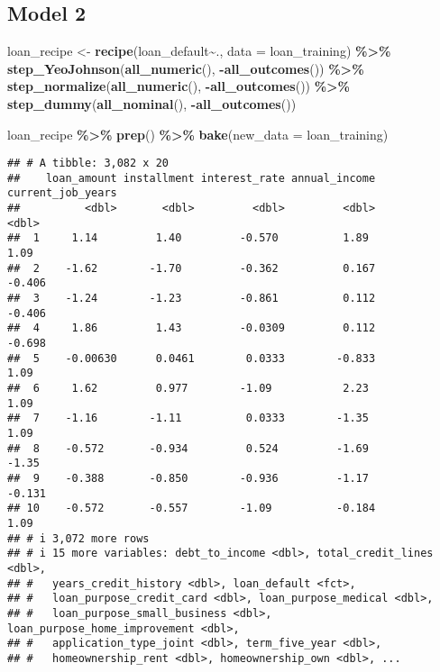 \documentclass[
]{article}
\newenvironment{Shaded}{\begin{snugshade}}{\end{snugshade}}
\newcommand{\AttributeTok}[1]{\textcolor[rgb]{0.13,0.29,0.53}{#1}}
\newcommand{\FunctionTok}[1]{\textcolor[rgb]{0.13,0.29,0.53}{\textbf{#1}}}
\newcommand{\NormalTok}[1]{#1}
\newcommand{\OtherTok}[1]{\textcolor[rgb]{0.56,0.35,0.01}{#1}}
\newcommand{\SpecialCharTok}[1]{\textcolor[rgb]{0.81,0.36,0.00}{\textbf{#1}}}
\begin{document}
\subsection{Model 2}\label{model-2}

\begin{Shaded}
\begin{Highlighting}[]
\NormalTok{loan\_recipe }\OtherTok{\textless{}{-}} \FunctionTok{recipe}\NormalTok{(loan\_default}\SpecialCharTok{\textasciitilde{}}\NormalTok{., }\AttributeTok{data =}\NormalTok{ loan\_training) }\SpecialCharTok{\%\textgreater{}\%} 
                  \FunctionTok{step\_YeoJohnson}\NormalTok{(}\FunctionTok{all\_numeric}\NormalTok{(), }\SpecialCharTok{{-}}\FunctionTok{all\_outcomes}\NormalTok{()) }\SpecialCharTok{\%\textgreater{}\%} 
                   \FunctionTok{step\_normalize}\NormalTok{(}\FunctionTok{all\_numeric}\NormalTok{(), }\SpecialCharTok{{-}}\FunctionTok{all\_outcomes}\NormalTok{()) }\SpecialCharTok{\%\textgreater{}\%} 
                   \FunctionTok{step\_dummy}\NormalTok{(}\FunctionTok{all\_nominal}\NormalTok{(), }\SpecialCharTok{{-}}\FunctionTok{all\_outcomes}\NormalTok{())}

\NormalTok{loan\_recipe }\SpecialCharTok{\%\textgreater{}\%} 
 \FunctionTok{prep}\NormalTok{() }\SpecialCharTok{\%\textgreater{}\%} 
  \FunctionTok{bake}\NormalTok{(}\AttributeTok{new\_data =}\NormalTok{ loan\_training)}
\end{Highlighting}
\end{Shaded}

\begin{verbatim}
## # A tibble: 3,082 x 20
##    loan_amount installment interest_rate annual_income current_job_years
##          <dbl>       <dbl>         <dbl>         <dbl>             <dbl>
##  1     1.14         1.40         -0.570          1.89              1.09 
##  2    -1.62        -1.70         -0.362          0.167            -0.406
##  3    -1.24        -1.23         -0.861          0.112            -0.406
##  4     1.86         1.43         -0.0309         0.112            -0.698
##  5    -0.00630      0.0461        0.0333        -0.833             1.09 
##  6     1.62         0.977        -1.09           2.23              1.09 
##  7    -1.16        -1.11          0.0333        -1.35              1.09 
##  8    -0.572       -0.934         0.524         -1.69             -1.35 
##  9    -0.388       -0.850        -0.936         -1.17             -0.131
## 10    -0.572       -0.557        -1.09          -0.184             1.09 
## # i 3,072 more rows
## # i 15 more variables: debt_to_income <dbl>, total_credit_lines <dbl>,
## #   years_credit_history <dbl>, loan_default <fct>,
## #   loan_purpose_credit_card <dbl>, loan_purpose_medical <dbl>,
## #   loan_purpose_small_business <dbl>, loan_purpose_home_improvement <dbl>,
## #   application_type_joint <dbl>, term_five_year <dbl>,
## #   homeownership_rent <dbl>, homeownership_own <dbl>, ...
\end{verbatim}
\end{document}

